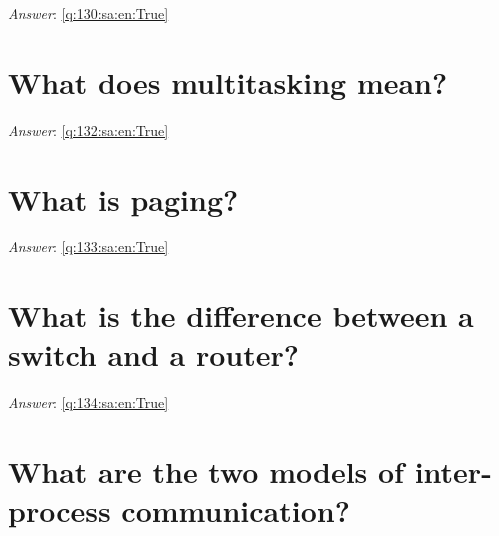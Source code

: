 \documentclass[a4paper,11pt,oneside]{book}
\begin{document}
\begin{sloppypar}
\noindent\makebox[\textwidth]{\hrulefill}

\vspace{1cm}

\textit{Answer}: \autoref{q:130:sa:en:True}



\section{What does multitasking mean?}

\label{q:132:sa:en:False}

\vspace{2cm}

\noindent\makebox[\textwidth]{\hrulefill}

\vspace{1cm}

\textit{Answer}: \autoref{q:132:sa:en:True}



\section{What is paging?}

\label{q:133:sa:en:False}

\vspace{2cm}

\noindent\makebox[\textwidth]{\hrulefill}

\vspace{1cm}

\textit{Answer}: \autoref{q:133:sa:en:True}



\section{What is the difference between a switch and a router?}

\label{q:134:sa:en:False}

\vspace{2cm}

\noindent\makebox[\textwidth]{\hrulefill}

\vspace{1cm}

\textit{Answer}: \autoref{q:134:sa:en:True}



\section{What are the two models of inter-process communication?}


\end{sloppypar}
\end{document}
